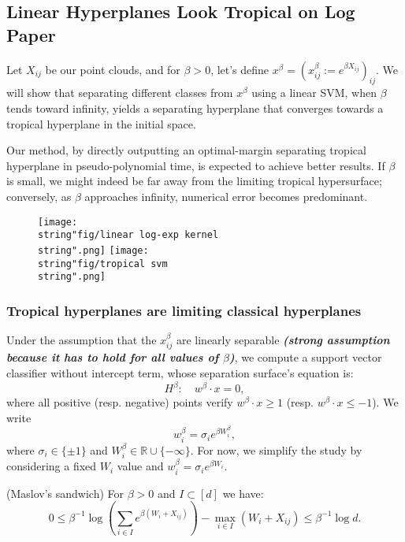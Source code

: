
\newpage
\subsection{Linear Hyperplanes Look Tropical on Log Paper}

Let $X_{ij}$ be our point clouds, and for $\beta>0$, let's define
$x^{\beta}=(x_{ij}^{\beta}:=e^{\beta X_{ij}})_{ij}$. We will show
that separating different classes from $x^{\beta}$ using a linear
SVM, when $\beta$ tends toward infinity, yields a separating hyperplane
that converges towards a tropical hyperplane in the initial space.

Our method, by directly outputting an optimal-margin separating tropical
hyperplane in pseudo-polynomial time, is expected to achieve better
results. If $\beta$ is small, we might indeed be far away from the
limiting tropical hypersurface; conversely, as $\beta$ approaches
infinity, numerical error becomes predominant.

\begin{figure}[h]
\centering \texttt{[image: \\string"fig/linear log-exp kernel\\string".png]}
\texttt{[image: \\string"fig/tropical svm\\string".png]} 
\end{figure}


\subsubsection{Tropical hyperplanes are limiting classical hyperplanes}

Under the assumption that the $x_{ij}^{\beta}$ are linearly separable
\textbf{\emph{(strong assumption because it has to hold for all values
of $\beta$)}}, we compute a support vector classifier without intercept
term, whose separation surface's equation is: 
\[
H^{\beta}:\quad w^{\beta}\cdot x=0,
\]
where all positive (resp. negative) points verify $w^{\beta}\cdot x\ge1$
(resp. $w^{\beta}\cdot x\le-1$). We write 
\[
w_{i}^{\beta}=\sigma_{i}e^{\beta W_{i}^{\beta}},
\]
where $\sigma_{i}\in\{\pm1\}$ and $W_{i}^{\beta}\in\mathbb{R}\cup\{-\infty\}$.
For now, we simplify the study by considering a fixed $W_{i}$ value
and $w_{i}^{\beta}=\sigma_{i}e^{\beta W_{i}}$. 
\begin{lem}
(Maslov's sandwich) For $\beta>0$ and $I\subset[d]$ we have: 
\[
0\leq\beta^{-1}\log\left(\sum_{i\in I}e^{\beta(W_{i}+X_{ij})}\right)-\max_{i\in I}(W_{i}+X_{ij})\le\beta^{-1}\log d.
\]
\end{lem}

